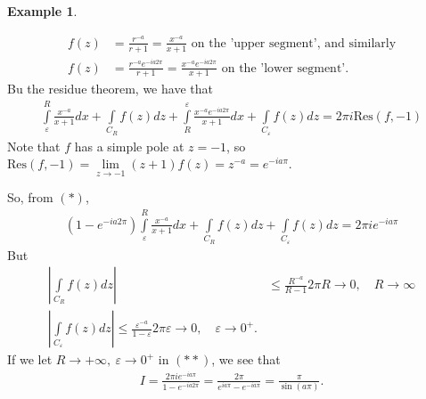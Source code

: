 \documentclass[12pt, a4paper]{article}
\theoremstyle{plain}
\theoremstyle{definition}
\newtheorem{example}{Example} %
\begin{document}
\begin{example}
\begin{multicols}{2}
\begin{figure}[H]
					\end{figure}
				\end{multicols}
				\begin{align*}
					f(z) &= \frac{r^{-a}}{r+1} = \frac{x^{-a}}{x+1} \text{ on the 'upper segment', and similarly}\\
					f(z) &= \frac{r^{-a}e^{-ia2\pi}}{r+1} = \frac{x^{-a}e^{-ia2\pi}}{x+1}\text{ on the 'lower segment'}.
				\end{align*}
				Bu the residue theorem, we have that
				\begin{align*}
					\int\limits_{\varepsilon}^{R}\frac{x^{-a}}{x+1}dx + \int\limits_{C_R}f(z)dz + \int\limits_{R}^{\varepsilon}\frac{x^{-a}e^{-ia2\pi}}{x+1}dx + \int\limits_{C_\varepsilon}f(z)dz = 2\pi i \mathrm{Res}(f,-1)\tag*{$(*)$}
				\end{align*}
				Note that $f$ has a simple pole at $z=-1$, so $\mathrm{Res}(f,-1) =\lim\limits_{z\to -1}(z+1)f(z) = z^{-a}=e^{-ia\pi}$.

				So, from $(*)$, 
				\begin{align*}
					(1-e^{-ia2\pi})\int\limits_{\varepsilon}^{R}\frac{x^{-a}}{x+1}dx + \int\limits_{C_R}f(z)dz + \int\limits_{C_\varepsilon}f(z)dz = 2\pi ie^{-ia\pi}\tag*{$(**)$}
				\end{align*}
				But
				\begin{align*}
					\left|\int\limits_{C_R}f(z)dz\right| &\le \frac{R^{-a}}{R-1}2\pi R\to 0,\quad R\to \infty\\
					\left|\int\limits_{C_\varepsilon}f(z)dz\right| \le \frac{\varepsilon^{-a}}{1- \varepsilon}2\pi \varepsilon \to 0,\quad \varepsilon\to0^+.
				\end{align*}
				If we let $R\to +\infty,\:\varepsilon\to 0^+$ in $(**)$, we see that
				\begin{align*}
					I = \frac{2\pi i e^{-ia\pi}}{1-e^{-ia2\pi}} = \frac{2\pi}{e^{ia\pi}-e^{-ia\pi}} = \frac{\pi}{\sin(a\pi)}.
				\end{align*}
			\end{example}
\end{document}
